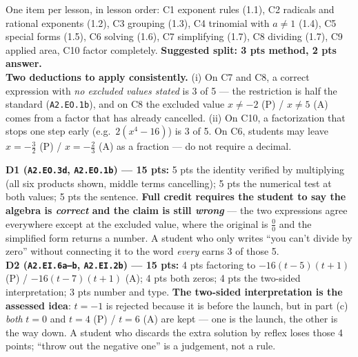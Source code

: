 \documentclass[10pt]{article}
\begin{document}
\boxguard[10]
\begin{teachernote}
\footnotesize
One item per lesson, in lesson order: C1 exponent rules (1.1), C2 radicals and rational
exponents (1.2), C3 grouping (1.3), C4 trinomial with $a\ne1$ (1.4), C5 special forms (1.5),
C6 solving (1.6), C7 simplifying (1.7), C8 dividing (1.7), C9 applied area, C10 factor
completely. \textbf{Suggested split: 3 pts method, 2 pts answer.}\\[2pt]
\textbf{Two deductions to apply consistently.} (i) On C7 and C8, a correct expression with
\emph{no excluded values stated} is 3 of 5 --- the restriction is half the standard
(\texttt{A2.EO.1b}), and on C8 the excluded value $x\ne-2$ (P) / $x\ne5$ (A) comes from a factor
that has already cancelled. (ii) On C10, a factorization that stops one step early
(e.g.\ $2(x^4-16)$) is 3 of 5. On C6, students may leave $x=-\tfrac32$ (P) / $x=-\tfrac23$ (A)
as a fraction --- do not require a decimal.
\end{teachernote}

\boxguard[10]
\begin{teachernote}
\footnotesize
\textbf{D1 (\texttt{A2.EO.3d}, \texttt{A2.EO.1b}) --- 15 pts:} 5 pts the identity verified by
multiplying (all six products shown, middle terms cancelling); 5 pts the numerical test at both
values; 5 pts the sentence. \textbf{Full credit requires the student to say the algebra is
\emph{correct} and the claim is still \emph{wrong}} --- the two expressions agree everywhere
except at the excluded value, where the original is $\tfrac00$ and the simplified form returns a
number. A student who only writes ``you can't divide by zero'' without connecting it to the word
\emph{every} earns 3 of those 5.\\[2pt]
\textbf{D2 (\texttt{A2.EI.6a--b}, \texttt{A2.EI.2b}) --- 15 pts:} 4 pts factoring to
$-16(t-5)(t+1)$ (P) / $-16(t-7)(t+1)$ (A); 4 pts both zeros; 4 pts the two-sided interpretation;
3 pts number and type. \textbf{The two-sided interpretation is the assessed idea}: $t=-1$ is
rejected because it is before the launch, but in part (c) \emph{both} $t=0$ and $t=4$ (P) /
$t=6$ (A) are kept --- one is the launch, the other is the way down. A student who discards the
extra solution by reflex loses those 4 points; ``throw out the negative one'' is a judgement,
not a rule.
\end{teachernote}
\end{document}
